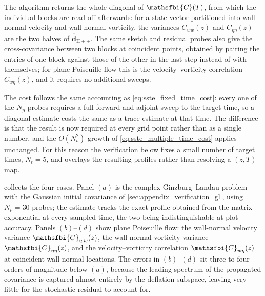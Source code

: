 The algorithm returns the whole diagonal of \(\mathsfbi{C}(T)\), from which the individual blocks
are read off afterwards: for a state vector partitioned into wall-normal velocity and wall-normal
vorticity, the variances \(C_{ww}(z)\) and \(C_{\eta\eta}(z)\) are the two halves of
\(\widehat{\mathbf{d}}_{\mathrm{H++}}\). The same sketch and residual probes also give the
cross-covariance between two blocks at coincident points, obtained by pairing the entries of one
block against those of the other in the last step instead of with themselves; for plane Poiseuille
flow this is the velocity--vorticity correlation \(C_{w\eta}(z)\), and it requires no additional
sweeps.

The cost follows the same accounting as \eqref{eq:sste_fixed_time_cost}: every one of the \(N_p\)
probes requires a full forward and adjoint sweep to the target time, so a diagonal estimate costs
the same as a trace estimate at that time. The difference is that the result is now required at
every grid point rather than as a single number, and the \(O(N_t^{2})\) growth of
\eqref{eq:sste_multiple_time_cost} applies unchanged. For this reason the verification below fixes a
small number of target times, \(N_t=5\), and overlays the resulting profiles rather than resolving a
\((z,T)\) map.

 collects the four cases. Panel \((a)\) is the complex
Ginzburg--Landau problem with the Gaussian initial covariance of
\cref{sec:appendix_verification_gl}, using \(N_p=30\) probes; the estimate tracks the exact profile
obtained from the matrix exponential at every sampled time, the two being indistinguishable at plot
accuracy. Panels \((b)\)--\((d)\) show plane Poiseuille flow: the wall-normal velocity variance
\(\mathsfbi{C}_{ww}(z)\), the wall-normal vorticity variance \(\mathsfbi{C}_{\eta\eta}(z)\), and the
velocity--vorticity correlation \(\mathsfbi{C}_{w\eta}(z)\) at coincident wall-normal locations. The
errors in \((b)\)--\((d)\) sit three to four orders of magnitude below \((a)\), because the leading
spectrum of the propagated covariance is captured almost entirely by the deflation subspace, leaving
very little for the stochastic residual to account for.

